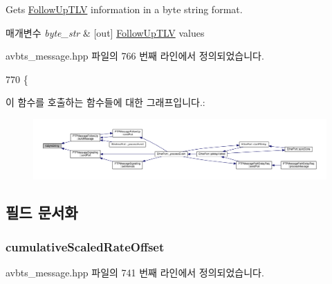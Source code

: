 Gets \hyperlink{class_follow_up_t_l_v}{Follow\+Up\+T\+LV} information in a byte string format. 


\begin{DoxyParams}{매개변수}
{\em byte\+\_\+str} & \mbox{[}out\mbox{]} \hyperlink{class_follow_up_t_l_v}{Follow\+Up\+T\+LV} values \\
\hline
\end{DoxyParams}


avbts\+\_\+message.\+hpp 파일의 766 번째 라인에서 정의되었습니다.


\begin{DoxyCode}
770                             \{
\end{DoxyCode}


이 함수를 호출하는 함수들에 대한 그래프입니다.\+:
\nopagebreak
\begin{figure}[H]
\begin{center}
\leavevmode
\includegraphics[width=350pt]{class_follow_up_t_l_v_acd2477c3b4df4f055d57ceae73e545a0_icgraph}
\end{center}
\end{figure}




\subsection{필드 문서화}
\subsubsection[{\texorpdfstring{cumulative\+Scaled\+Rate\+Offset}{cumulativeScaledRateOffset}}]{ cumulative\+Scaled\+Rate\+Offset\hspace{0.3cm}{\ttfamily [private]}}\hypertarget{class_follow_up_t_l_v_adfe06759e054a6c0f89334cfe862a00d}{}\label{class_follow_up_t_l_v_adfe06759e054a6c0f89334cfe862a00d}


avbts\+\_\+message.\+hpp 파일의 741 번째 라인에서 정의되었습니다.

